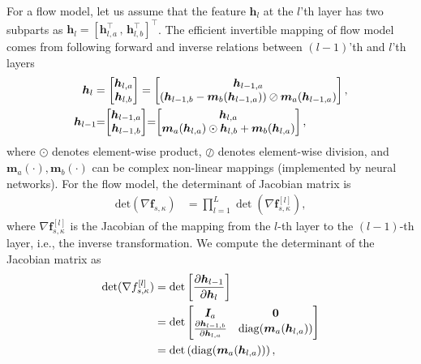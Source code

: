 \documentclass{ecai}
\begin{document}
For a flow model, let us assume that
the feature $\bm{h}_l$ at the $l$'th layer has two subparts as
$\bm{h}_l = [\bm{h}_{l,a}^{\intercal} \, , \, \bm{h}_{l,b}^{\intercal}]^{\intercal}$. The efficient invertible mapping of flow model comes from following forward and inverse relations between $(l-1)$'th and $l$'th layers
\begin{align}\label{eq-gl}
    \bm{h}_{l} &=
    \begin{bmatrix}
      \bm{h}_{l,a}\\
      \bm{h}_{l,b}
    \end{bmatrix}
    =
    \begin{bmatrix}
      \bm{h}_{l-1,a}\\
      \left(  \bm{h}_{l-1,b} - \bm{m}_b(\bm{h}_{l-1,a}) \right)\oslash \bm{m}_a(\bm{h}_{l-1,a}) 
    \end{bmatrix}, \nonumber\\
        \bm{h}_{l-1} \hspace{-0.1cm}&=\hspace{-0.1cm}
    \begin{bmatrix}
      \bm{h}_{l-1,a}\\
      \bm{h}_{l-1,b}
    \end{bmatrix}
    \hspace{-0.1cm}=\hspace{-0.1cm}
    \begin{bmatrix}
      \bm{h}_{l,a}\\
      \bm{m}_a(\bm{h}_{l,a})\odot \bm{h}_{l,b} + \bm{m}_b(\bm{h}_{l,a})
    \end{bmatrix},
\end{align}
where $\odot$ denotes element-wise product, $\oslash$ denotes
element-wise division, and $\bm{m}_a(\cdot), \bm{m}_b(\cdot)$ can be
complex non-linear mappings (implemented by neural networks).
For the flow model, the determinant of Jacobian matrix is
\begin{equation}\label{eq:cat-jacobian}
  \begin{array}{rl}
    \mathrm{det}(\nabla{\bm{f}_{s,\kappa}}) & = \prod_{l=1}^L \det (\nabla{\bm{f}_{s,\kappa}^{[l]}}),
  \end{array}
\end{equation}
where $\nabla{\bm{f}_{s,\kappa}^{[l]}}$ is the Jacobian of the mapping from the $l$-th layer to the $(l-1)$-th layer, i.e., the inverse transformation. We compute the determinant of the Jacobian matrix as
\begin{align}\label{eq-hl-determinate}
  \det (\nabla{f_{s,\kappa}^{[l]}})& = \det \left[  \frac{ \partial \bm{h}_{l-1}}{\partial \bm{h}_l} \right] \nonumber\\
                                   & = \det
                                     \begin{bmatrix}
                                       \bm{I}_a & \mathbf{0} \nonumber\\
                                       \frac{ \partial \bm{h}_{l-1,b}}{\partial \bm{h}_{l,a}} & \mathrm{diag}(\bm{m}_a(\bm{h}_{l,a}))
                                     \end{bmatrix}\nonumber\\
                                   &= \det \left( \mathrm{diag}(\bm{m}_a(\bm{h}_{l,a})) \right),
\end{align}
\end{document}
